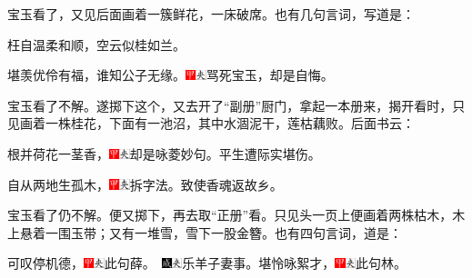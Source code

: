 宝玉看了，又见后面画着一簇鲜花，一床破席。也有几句言词，写道是：

枉自温柔和顺，空云似桂如兰。

堪羡优伶有福，谁知公子无缘。{\includegraphics[width=3mm]{../Images/00002}\includegraphics[width=3mm]{../Images/00012}\footnotesize \kaishu 骂死宝玉，却是自悔。}

宝玉看了不解。遂掷下这个，又去开了“副册”厨门，拿起一本册来，揭开看时，只见画着一株桂花，下面有一池沼，其中水涸泥干，莲枯藕败。后面书云：

根并荷花一茎香，{\includegraphics[width=3mm]{../Images/00002}\includegraphics[width=3mm]{../Images/00012}\footnotesize \kaishu 却是咏菱妙句。}平生遭际实堪伤。

自从两地生孤木，{\includegraphics[width=3mm]{../Images/00002}\includegraphics[width=3mm]{../Images/00012}\footnotesize \kaishu 拆字法。}致使香魂返故乡。

宝玉看了仍不解。便又掷下，再去取“正册”看。只见头一页上便画着两株枯木，木上悬着一围玉带；又有一堆雪，雪下一股金簪。也有四句言词，道是：

可叹停机德，{{\includegraphics[width=3mm]{../Images/00002}\includegraphics[width=3mm]{../Images/00012}\footnotesize \kaishu 此句薛。　}\includegraphics[width=3mm]{../Images/00005}\includegraphics[width=3mm]{../Images/00012}\footnotesize \kaishu 乐羊子妻事。}堪怜咏絮才，{\includegraphics[width=3mm]{../Images/00002}\includegraphics[width=3mm]{../Images/00012}\footnotesize \kaishu 此句林。}

